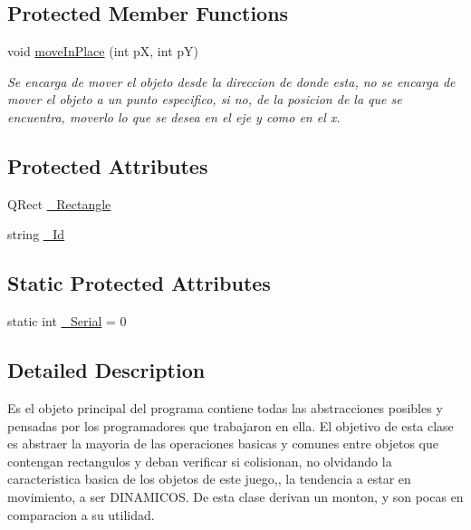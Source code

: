 \subsection*{Protected Member Functions}
\begin{DoxyCompactItemize}
\item 
void \hyperlink{class_game_object_ae8bb850eb78ebf34e764b8dbd3ea5fab}{move\-In\-Place} (int p\-X, int p\-Y)
\begin{DoxyCompactList}\small\item\em Se encarga de mover el objeto desde la direccion de donde esta, no se encarga de mover el objeto a un punto especifico, si no, de la posicion de la que se encuentra, moverlo lo que se desea en el eje y como en el x. \end{DoxyCompactList}\end{DoxyCompactItemize}
\subsection*{Protected Attributes}
\begin{DoxyCompactItemize}
\item 
Q\-Rect \hyperlink{class_game_object_a38a2dff83aae28ebffee5c4b833626a2}{\-\_\-\-Rectangle}
\item 
string \hyperlink{class_game_object_a74075bae5de6b22a17098e60964e676b}{\-\_\-\-Id}
\end{DoxyCompactItemize}
\subsection*{Static Protected Attributes}
\begin{DoxyCompactItemize}
\item 
static int \hyperlink{class_game_object_aeeec17db7fc77fe70148a9d6edd99ea4}{\-\_\-\-Serial} = 0
\end{DoxyCompactItemize}


\subsection{Detailed Description}
Es el objeto principal del programa contiene todas las abstracciones posibles y pensadas por los programadores que trabajaron en ella. El objetivo de esta clase es abstraer la mayoria de las operaciones basicas y comunes entre objetos que contengan rectangulos y deban verificar si colisionan, no olvidando la caracteristica basica de los objetos de este juego,, la tendencia a estar en movimiento, a ser D\-I\-N\-A\-M\-I\-C\-O\-S. De esta clase derivan un monton, y son pocas en comparacion a su utilidad. 

